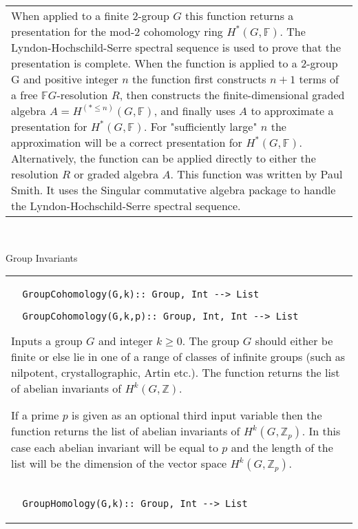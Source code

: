 \documentclass[a4paper,11pt]{report}
\begin{document}
{\begin{center}
\begin{tabular}{|l|}
 When applied to a finite $2$-group $G$ this function returns a presentation for the mod-$2$ cohomology ring $H^\ast(G,\mathbb F)$. The Lyndon-Hochschild-Serre spectral sequence is used to prove that the
presentation is complete. When the function is applied to a $2$-group G and positive integer $n$ the function first constructs $n+1$ terms of a free $\mathbb FG$-resolution $R$, then constructs the finite-dimensional graded algebra $A=H^{(\ast \le n)}(G,\mathbb F)$, and finally uses $A$ to approximate a presentation for $H^*(G,\mathbb F)$. For "sufficiently large" $n$ the approximation will be a correct presentation for $H^\ast(G,\mathbb F)$. Alternatively, the function can be applied directly to either the resolution $R$ or graded algebra $A$. This function was written by Paul Smith. It uses the Singular commutative
algebra package to handle the Lyndon-Hochschild-Serre spectral sequence. \\
\end{tabular}\\[2mm]
\end{center}

 Group Invariants \begin{center}
\begin{tabular}{|l|} \index{GroupCohomology} 
\begin{verbatim}  GroupCohomology(G,k):: Group, Int --> List
\end{verbatim}
 
\begin{verbatim}  GroupCohomology(G,k,p):: Group, Int, Int --> List
\end{verbatim}


 

 Inputs a group $G$ and integer $k \ge 0$. The group $G$ should either be finite or else lie in one of a range of classes of infinite
groups (such as nilpotent, crystallographic, Artin etc.). The function returns
the list of abelian invariants of $H^k(G,\mathbb Z)$. 

 If a prime $p$ is given as an optional third input variable then the function returns the
list of abelian invariants of $H^k(G,\mathbb Z_p)$. In this case each abelian invariant will be equal to $p$ and the length of the list will be the dimension of the vector space $H^k(G,\mathbb Z_p)$. \\
 \index{GroupHomology} 
\begin{verbatim}  GroupHomology(G,k):: Group, Int --> List
\end{verbatim}
 

\end{tabular}
\end{center}}
\end{document}
